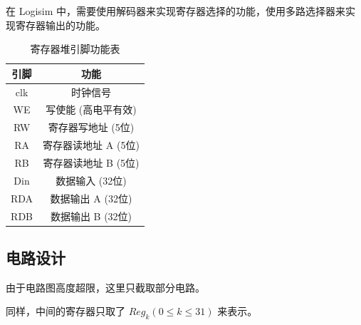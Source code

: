 \documentclass[12pt, a4paper]{ctexart}
\begin{document}
在 Logisim 中，需要使用解码器来实现寄存器选择的功能，使用多路选择器来实现寄存器输出的功能。

\begin{table}[H]
    \centering
    \begin{tabular}{|c|c|}
        \hline
        引脚 & 功能 \\
        \hline
        clk & 时钟信号 \\
        WE  & 写使能 (高电平有效) \\
        RW  & 寄存器写地址 (5位) \\
        RA  & 寄存器读地址 A (5位) \\
        RB  & 寄存器读地址 B (5位) \\
        Din & 数据输入 (32位) \\
        RDA & 数据输出 A (32位) \\
        RDB & 数据输出 B (32位) \\
        \hline
    \end{tabular}
    \caption{寄存器堆引脚功能表}
\end{table}

\subsection{电路设计}

由于电路图高度超限，这里只截取部分电路。

同样，中间的寄存器只取了 $Reg_k(0\le k\le 31)$ 来表示。
\end{document}
